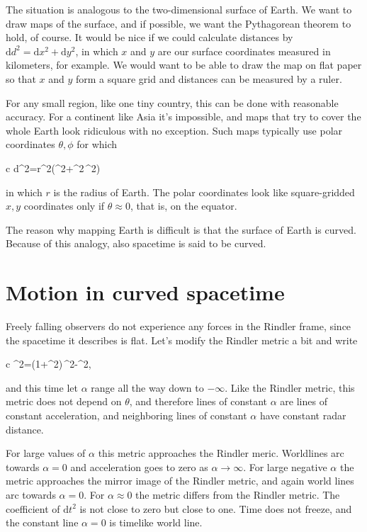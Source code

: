 \documentclass[11pt,oneside%
]{memoir}
\newenvironment{eqna}{\begin{IEEEeqnarray*}{c}}{\end{IEEEeqnarray*}\ignorespacesafterend}
\newcommand{\dd}{\mathrm{d}}
\begin{document}
The situation is analogous to the two-dimensional surface of Earth. We want to draw maps of the surface, and if possible, we want the Pythagorean theorem to hold, of course. It would be nice if we could calculate distances by \(\dd d^2=\dd x^2+\dd y^2\), in which \(x\) and \(y\) are our surface coordinates measured in kilometers, for example. We would want to be able to draw the map on flat paper so that \(x\) and \(y\) form a square grid and distances can be measured by a ruler.

For any small region, like one tiny country, this can be done with reasonable accuracy. For a continent like Asia it's impossible, and maps that try to cover the whole Earth look ridiculous with no exception. Such maps typically use polar coordinates \(\theta,\phi\) for which
\begin{eqna}
\dd d^2=r^2\left(\dd\theta^2+\sin^2\theta\,\dd\phi^2\right)
\end{eqna}
in which \(r\) is the radius of Earth. The polar coordinates look like square-gridded \(x,y\) coordinates only if \(\theta\approx0\), that is, on the equator.

The reason why mapping Earth is difficult is that the surface of Earth is curved. Because of this analogy, also spacetime is said to be curved.

\section{Motion in curved spacetime}

Freely falling observers do not experience any forces in the Rindler frame, since the spacetime it describes is flat. Let's modify the Rindler metric a bit and write
\begin{eqna}
\dd\tau^2=\left(1+\alpha^2\right)\,\dd\theta^2-\dd\alpha^2,
\end{eqna}
and this time let \(\alpha\) range all the way down to \(-\infty\). Like the Rindler metric, this metric does not depend on \(\theta\), and therefore lines of constant \(\alpha\) are lines of constant acceleration, and neighboring lines of constant \(\alpha\) have constant radar distance.

For large values of \(\alpha\) this metric approaches the Rindler meric. Worldlines arc towards \(\alpha=0\) and acceleration goes to zero as \(\alpha\rightarrow\infty\). For large negative \(\alpha\) the metric approaches the mirror image of the Rindler metric, and again world lines arc towards \(\alpha=0\). For \(\alpha\approx 0\) the metric differs from the Rindler metric. The coefficient of \(\dd t^2\) is not close to zero but close to one. Time does not freeze, and the constant line \(\alpha=0\) is timelike world line.
\end{document}
